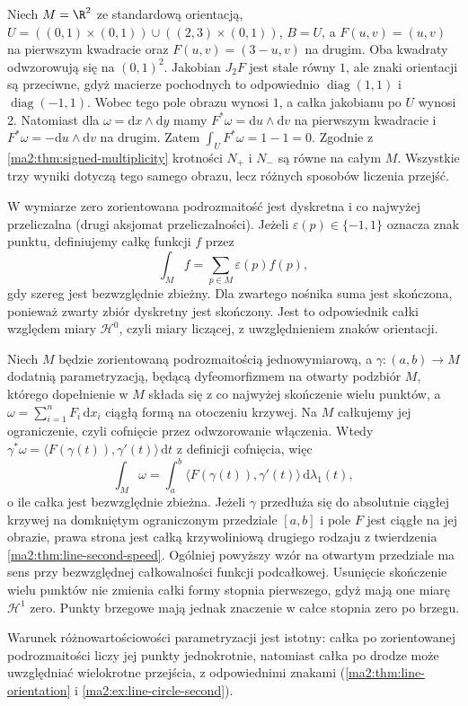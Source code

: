\begin{przyklad}
\label{ma2:ex:signed-multiplicity-plane}
Niech $M=\R^2$ ze standardową orientacją,
$U=((0,1)\times(0,1))\cup((2,3)\times(0,1))$,
$B=U$, a $F(u,v)=(u,v)$ na pierwszym kwadracie
oraz $F(u,v)=(3-u,v)$ na drugim.
Oba kwadraty odwzorowują się na $(0,1)^2$.
Jakobian $J_2F$ jest stale równy $1$,
ale znaki orientacji są przeciwne, gdyż
macierze pochodnych to odpowiednio
$\operatorname{diag}(1,1)$ i
$\operatorname{diag}(-1,1)$.
Wobec tego pole obrazu wynosi $1$,
a całka jakobianu po $U$ wynosi $2$.
Natomiast dla $\omega=\mathrm dx\wedge\mathrm dy$
mamy $F^*\omega=\mathrm du\wedge\mathrm dv$
na pierwszym kwadracie i
$F^*\omega=-\mathrm du\wedge\mathrm dv$
na drugim. Zatem $\int_U F^*\omega=1-1=0$.
Zgodnie z \ref{ma2:thm:signed-multiplicity}
krotności $N_+$ i $N_-$ są równe na całym $M$.
Wszystkie trzy wyniki dotyczą tego samego obrazu,
lecz różnych sposobów liczenia przejść.
\end{przyklad}

W wymiarze zero zorientowana podrozmaitość
jest dyskretna i co najwyżej przeliczalna
(drugi aksjomat przeliczalności).
Jeżeli $\varepsilon(p)\in\{-1,1\}$ oznacza
znak punktu, definiujemy całkę funkcji $f$ przez
\[
 \int_M f=\sum_{p\in M}\varepsilon(p)f(p),
\]
gdy szereg jest bezwzględnie zbieżny.
Dla zwartego nośnika suma jest skończona,
ponieważ zwarty zbiór dyskretny jest skończony.
Jest to odpowiednik całki względem miary
$\mathcal H^0$, czyli miary liczącej,
z uwzględnieniem znaków orientacji.

\begin{przyklad}
\label{ma2:ex:form-line-integral}
Niech $M$ będzie zorientowaną podrozmaitością
jednowymiarową, a $\gamma:(a,b)\to M$ dodatnią
parametryzacją, będącą dyfeomorfizmem na otwarty
podzbiór $M$, którego dopełnienie w $M$ składa się
z co najwyżej skończenie wielu punktów,
a $\omega=\sum_{i=1}^n F_i\,\mathrm dx_i$
ciągłą formą na otoczeniu krzywej. Na $M$
całkujemy jej ograniczenie, czyli cofnięcie
przez odwzorowanie włączenia.
Wtedy
$\gamma^*\omega=\langle F(\gamma(t)),\gamma'(t)\rangle
\,\mathrm dt$ z definicji cofnięcia, więc
\[
 \int_M\omega=\int_a^b
 \langle F(\gamma(t)),\gamma'(t)\rangle\,
 \mathrm d\lambda_1(t),
\]
o ile całka jest bezwzględnie zbieżna.
Jeżeli $\gamma$ przedłuża się do absolutnie
ciągłej krzywej na domkniętym ograniczonym
przedziale $[a,b]$ i pole $F$ jest ciągłe na jej
obrazie, prawa strona jest całką krzywoliniową
drugiego rodzaju z twierdzenia
\ref{ma2:thm:line-second-speed}.
Ogólniej powyższy wzór na otwartym przedziale
ma sens przy bezwzględnej całkowalności funkcji
podcałkowej. Usunięcie skończenie wielu punktów
nie zmienia całki formy stopnia pierwszego,
gdyż mają one miarę $\mathcal H^1$ zero.
Punkty brzegowe mają jednak znaczenie
w całce stopnia zero po brzegu.

Warunek różnowartościowości parametryzacji
jest istotny: całka po zorientowanej
podrozmaitości liczy jej punkty jednokrotnie,
natomiast całka po drodze może uwzględniać
wielokrotne przejścia, z odpowiednimi znakami
(\ref{ma2:thm:line-orientation}
i \ref{ma2:ex:line-circle-second}).
\end{przyklad}

